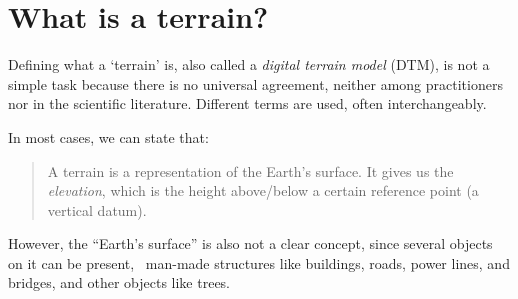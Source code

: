 
\setchapterpreamble[u]{\margintoc}

\chapter{What is a terrain?}%
\label{chap:whatisterrain}

\graphicspath{{whatisterrain/}}







Defining what a `terrain' is, also called a \emph{digital terrain model} (DTM), is not a simple task because there is no universal agreement, neither among practitioners nor in the scientific literature.
Different terms are used, often interchangeably.

In most cases, we can state that:

\begin{quote}
A terrain is a representation of the Earth's surface. 
It gives us the \emph{elevation}, which is the height above/below a certain reference point (a vertical datum).
\end{quote}

However, the ``Earth's surface'' is also not a clear concept, since several objects on it can be present, \eg\ man-made structures like buildings, roads, power lines, and bridges, and other objects like trees.


